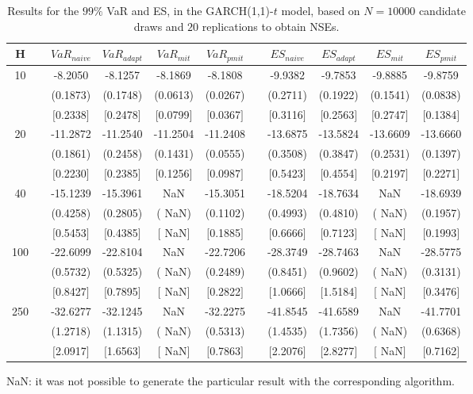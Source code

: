 \begin{table}[h] 
\centering 
\caption{Results for the $99\%$ VaR and ES, in the GARCH(1,1)-$t$ model, based on $N=10000$ candidate draws and $20$ replications to obtain NSEs.} 
\label{tab:res_algos_t_garch2_noS} 
\begin{tabular}{ccccccccccc}  
 H & & $VaR_{naive}$ & $VaR_{adapt}$ & $VaR_{mit}$  & $VaR_{pmit}$ &  & $ES_{naive}$ & $ES_{adapt}$ & $ES_{mit}$ & $ES_{pmit}$ \\ \hline 
10 & & -8.2050 & -8.1257 & -8.1869 & -8.1808 & & -9.9382 & -9.7853 & -9.8885 & -9.8759  \\ 
 & & (0.1873) & (0.1748) & (0.0613) & (0.0267) & & (0.2711) & (0.1922) & (0.1541) & (0.0838)   \\ 
 & & $[$0.2338$]$ & $[$0.2478$]$ & $[$0.0799$]$ & $[$0.0367$]$ & & $[$0.3116$]$ & $[$0.2563$]$ & $[$0.2747$]$ & $[$0.1384$]$  \\ [1ex] 
20 & & -11.2872 & -11.2540 & -11.2504 & -11.2408 & & -13.6875 & -13.5824 & -13.6609 & -13.6660  \\ 
 & & (0.1861) & (0.2458) & (0.1431) & (0.0555) & & (0.3508) & (0.3847) & (0.2531) & (0.1397)   \\ 
 & & $[$0.2230$]$ & $[$0.2385$]$ & $[$0.1256$]$ & $[$0.0987$]$ & & $[$0.5423$]$ & $[$0.4554$]$ & $[$0.2197$]$ & $[$0.2271$]$  \\ [1ex] 
40 & & -15.1239 & -15.3961 &    NaN & -15.3051 & & -18.5204 & -18.7634 &    NaN & -18.6939  \\ 
 & & (0.4258) & (0.2805) & (   NaN) & (0.1102) & & (0.4993) & (0.4810) & (   NaN) & (0.1957)   \\ 
 & & $[$0.5453$]$ & $[$0.4385$]$ & $[$   NaN$]$ & $[$0.1885$]$ & & $[$0.6666$]$ & $[$0.7123$]$ & $[$   NaN$]$ & $[$0.1993$]$  \\ [1ex] 
100 & & -22.6099 & -22.8104 &    NaN & -22.7206 & & -28.3749 & -28.7463 &    NaN & -28.5775  \\ 
 & & (0.5732) & (0.5325) & (   NaN) & (0.2489) & & (0.8451) & (0.9602) & (   NaN) & (0.3131)   \\ 
 & & $[$0.8427$]$ & $[$0.7895$]$ & $[$   NaN$]$ & $[$0.2822$]$ & & $[$1.0666$]$ & $[$1.5184$]$ & $[$   NaN$]$ & $[$0.3476$]$  \\ [1ex] 
250 & & -32.6277 & -32.1245 &    NaN & -32.2275 & & -41.8545 & -41.6589 &    NaN & -41.7701  \\ 
 & & (1.2718) & (1.1315) & (   NaN) & (0.5313) & & (1.4535) & (1.7356) & (   NaN) & (0.6368)   \\ 
 & & $[$2.0917$]$ & $[$1.6563$]$ & $[$   NaN$]$ & $[$0.7863$]$ & & $[$2.2076$]$ & $[$2.8277$]$ & $[$   NaN$]$ & $[$0.7162$]$  \\ [1ex] 
\hline 
\end{tabular} 
\raggedright 

\vspace{5pt}\footnotesize{NaN: it was not possible to generate the particular result with the corresponding algorithm.} 
\end{table} 
